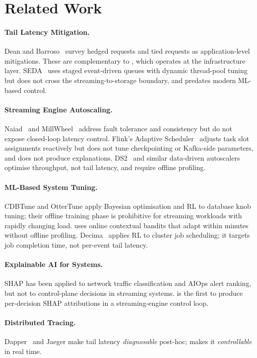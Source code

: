 \section{Related Work}
\label{sec:related}

\paragraph{Tail Latency Mitigation.}
Dean and Barroso~\cite{dean2013tail} survey hedged requests and
tied requests as application-level mitigations. These are complementary
to \xtal, which operates at the infrastructure layer.
SEDA~\cite{welsh2001seda} uses staged event-driven queues with dynamic
thread-pool tuning but does not cross the streaming-to-storage boundary,
and predates modern ML-based control.

\paragraph{Streaming Engine Autoscaling.}
Naiad~\cite{murray2013naiad} and MillWheel~\cite{akidau2013millwheel}
address fault tolerance and consistency but do not expose closed-loop
latency control. Flink's Adaptive Scheduler~\cite{carbone2015flink}
adjusts task slot assignments reactively but does not tune checkpointing
or Kafka-side parameters, and does not produce explanations.
DS2~\cite{kalavri2018} and similar data-driven autoscalers optimise
throughput, not tail latency, and require offline profiling.

\paragraph{ML-Based System Tuning.}
CDBTune and OtterTune apply Bayesian optimisation and RL to database
knob tuning; their offline training phase is prohibitive for streaming
workloads with rapidly changing load. \xtal uses online contextual
bandits that adapt within minutes without offline profiling.
Decima~\cite{mao2019} applies RL to cluster job scheduling; it targets
job completion time, not per-event tail latency.

\paragraph{Explainable AI for Systems.}
SHAP has been applied to network traffic classification and AIOps alert
ranking, but not to control-plane decisions in streaming systems.
\xtal is the first to produce per-decision SHAP attributions in a
streaming-engine control loop.

\paragraph{Distributed Tracing.}
Dapper~\cite{sigelman2010dapper} and Jaeger make tail latency
\emph{diagnosable} post-hoc; \xtal makes it \emph{controllable}
in real time.
